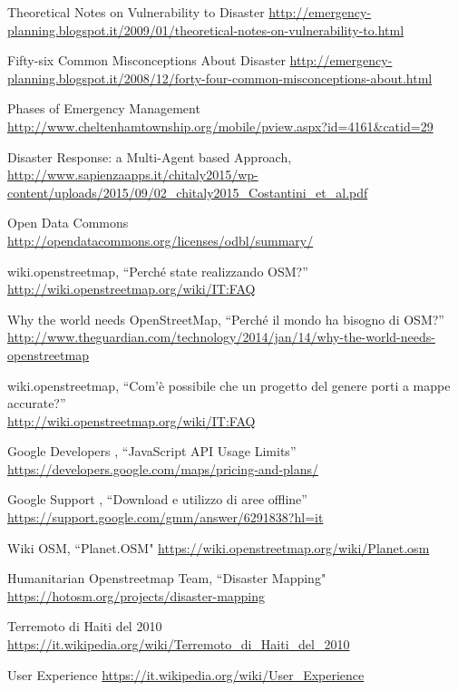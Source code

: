 \begin{thebibliography}{99}

Theoretical Notes on Vulnerability to Disaster
\url{http://emergency-planning.blogspot.it/2009/01/theoretical-notes-on-vulnerability-to.html}

Fifty-six Common Misconceptions About Disaster
\url{http://emergency-planning.blogspot.it/2008/12/forty-four-common-misconceptions-about.html}

Phases of Emergency Management
\url{http://www.cheltenhamtownship.org/mobile/pview.aspx?id=4161&catid=29}

Disaster Response: a Multi-Agent based Approach,
\url{http://www.sapienzaapps.it/chitaly2015/wp-content/uploads/2015/09/02_chitaly2015_Costantini_et_al.pdf}


Open Data Commons  \\
\url{http://opendatacommons.org/licenses/odbl/summary/}

wiki.openstreetmap, ``Perché state realizzando OSM?'' \\
\url{http://wiki.openstreetmap.org/wiki/IT:FAQ}

Why the world needs OpenStreetMap, ``Perché il mondo ha bisogno di OSM?''
\url{http://www.theguardian.com/technology/2014/jan/14/why-the-world-needs-openstreetmap}

wiki.openstreetmap, ``Com'è possibile che un progetto del genere porti a mappe accurate?'' \\
\url{http://wiki.openstreetmap.org/wiki/IT:FAQ}

Google Developers ,  ``JavaScript API Usage Limits''
\url{https://developers.google.com/maps/pricing-and-plans/}


Google Support ,  ``Download e utilizzo di aree offline''
\url{https://support.google.com/gmm/answer/6291838?hl=it}

Wiki OSM,  ``Planet.OSM"
\url{https://wiki.openstreetmap.org/wiki/Planet.osm}

Humanitarian Openstreetmap Team,  ``Disaster Mapping"
\url{https://hotosm.org/projects/disaster-mapping}

Terremoto di Haiti del 2010
\url{https://it.wikipedia.org/wiki/Terremoto_di_Haiti_del_2010}

User Experience
\url{https://it.wikipedia.org/wiki/User_Experience}




\end{thebibliography}



